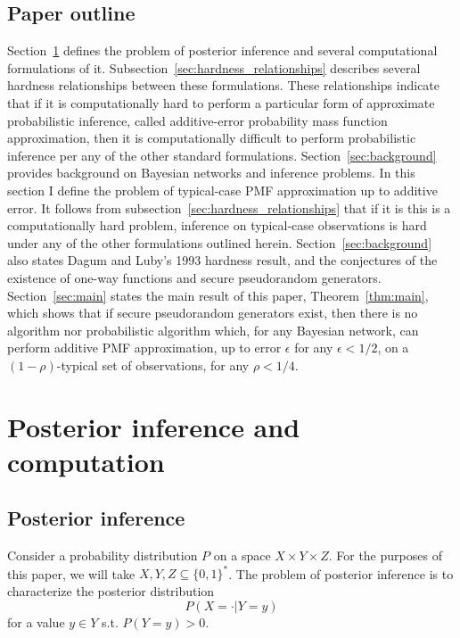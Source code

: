 \documentclass{article}
\theoremstyle{definition}
\theoremstyle{remark}
\begin{document}
\subsection{Paper outline}
Section~\ref{sec:posterior_inference} defines the problem of posterior inference and several computational formulations of it.
Subsection~\ref{sec:hardness_relationships} describes several hardness relationships between these formulations.
These relationships indicate that if it is computationally hard to perform a particular form of approximate probabilistic inference, called additive-error probability mass function approximation, then it is computationally difficult to perform probabilistic inference per any of the other standard formulations.
Section~\ref{sec:background} provides background on Bayesian networks and inference problems.
In this section I define the problem of typical-case PMF approximation up to additive error.
It follows from subsection~\ref{sec:hardness_relationships} that if it is this is a computationally hard problem, inference on typical-case observations is hard under any of the other formulations outlined herein.
Section~\ref{sec:background} also states Dagum and Luby's 1993 hardness result, and the conjectures of the existence of one-way functions and secure pseudorandom generators.
Section~\ref{sec:main} states the main result of this paper, Theorem~\ref{thm:main}, which shows that if secure pseudorandom generators exist, then there is no algorithm nor probabilistic algorithm which, for any Bayesian network, can perform additive PMF approximation, up to error $\epsilon$ for any $\epsilon < 1/2$, on a $(1 - \rho)$-typical set of observations, for any $\rho < 1/4$.

\section{Posterior inference and computation} \label{sec:posterior_inference}

\subsection{Posterior inference}

Consider a probability distribution $P$ on a space $X \times Y \times Z$.
For the purposes of this paper, we will take $X, Y, Z \subseteq \{0, 1\}^*$.
The problem of posterior inference is to characterize the posterior distribution
$$
P(X = \cdot | Y = y)
$$
for a value $y \in Y$ s.t. $P(Y = y) > 0$.
\end{document}

